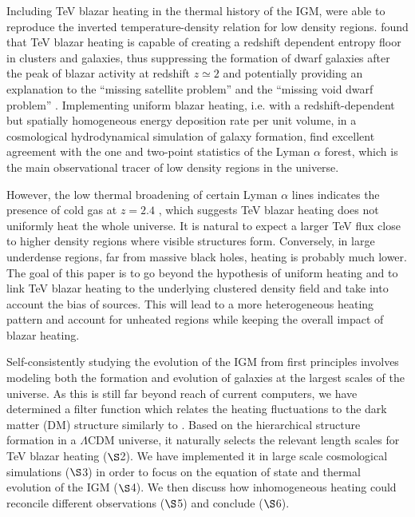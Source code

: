 \documentclass[numberedappendix]{emulateapj}
\begin{document}
Including TeV blazar heating in the thermal history of the IGM, \citet{2012ApJ...752...23C} were able to reproduce the inverted temperature-density relation for low density regions. \citet{2012ApJ...752...24P} found that TeV blazar heating  is capable of creating a redshift dependent entropy floor in clusters and galaxies, thus suppressing the formation of dwarf galaxies after the peak of blazar activity at redshift $z\simeq2$ and potentially providing an explanation to the ``missing satellite problem'' and the ``missing void dwarf problem'' \citep{2010AdAst2010E...8K}. Implementing uniform blazar heating, i.e. with a redshift-dependent but spatially homogeneous energy deposition rate per unit volume, in a cosmological hydrodynamical simulation of galaxy formation, \citet{2012MNRAS.423..149P} find excellent agreement with the one and two-point statistics of the Lyman $\alpha$ forest, which is the main observational tracer of low density regions in the universe.

However, the low thermal broadening of certain Lyman $\alpha$ lines indicates the presence of cold gas at $z =2.4$ \citep{2012ApJ...757L..30R}, which suggests TeV blazar heating does not uniformly heat the whole universe. It is natural to expect a larger TeV flux close to higher density regions where visible structures form. Conversely, in large underdense regions, far from massive black holes, heating is probably much lower. The goal of this paper is to go beyond the hypothesis of uniform heating and to link TeV blazar heating to the underlying clustered density field and take into account the bias of sources. This will lead to a more heterogeneous heating pattern and account for unheated regions while keeping the overall impact of blazar heating.

Self-consistently studying the evolution of the IGM from first principles involves modeling both the formation and evolution of galaxies at the largest scales of the universe. As this is still far beyond reach of current computers, we have determined a filter function which relates the heating fluctuations to the dark matter (DM) structure similarly to \citet{2007MNRAS.376.1680P,2005ApJ...626....1B,2014PhRvD..89h3010P}. Based on the hierarchical structure formation in a $\Lambda$CDM universe, it naturally selects the relevant length scales for TeV blazar heating ($\S$2). We have implemented it in large scale cosmological simulations ($\S$3) in order to focus on the equation of state and thermal evolution of the IGM ($\S$4). We then discuss how inhomogeneous heating could reconcile different observations ($\S$5) and conclude ($\S$6).
\end{document}
